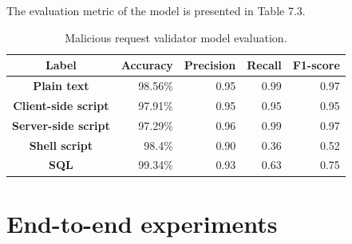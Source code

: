 The evaluation metric of the model is presented in Table 7.3.
\begin{table}[h!]
\centering
	\begin{tabular}{crrrr}
	\hline
	\textbf{Label}              & \multicolumn{1}{c}{\textbf{Accuracy}} & \multicolumn{1}{c}{\textbf{Precision}} & \multicolumn{1}{c}{\textbf{Recall}} & \multicolumn{1}{c}{\textbf{F1-score}} \\ \hline
	\textbf{Plain text}         & 98.56\%                               & 0.95                                   & 0.99                                & 0.97                                  \\
	\textbf{Client-side script} & 97.91\%                               & 0.95                                   & 0.95                                & 0.95                                  \\
	\textbf{Server-side script} & 97.29\%                               & 0.96                                   & 0.99                                & 0.97                                  \\
	\textbf{Shell script}       & 98.4\%                                & 0.90                                   & 0.36                                & 0.52                                  \\
	\textbf{SQL}                & 99.34\%                               & 0.93                                   & 0.63                                & 0.75                                  \\ \hline
	\end{tabular}
	\caption{\label{demo-table} Malicious request validator model evaluation.}
\end{table}
 
\section{End-to-end experiments}

	
